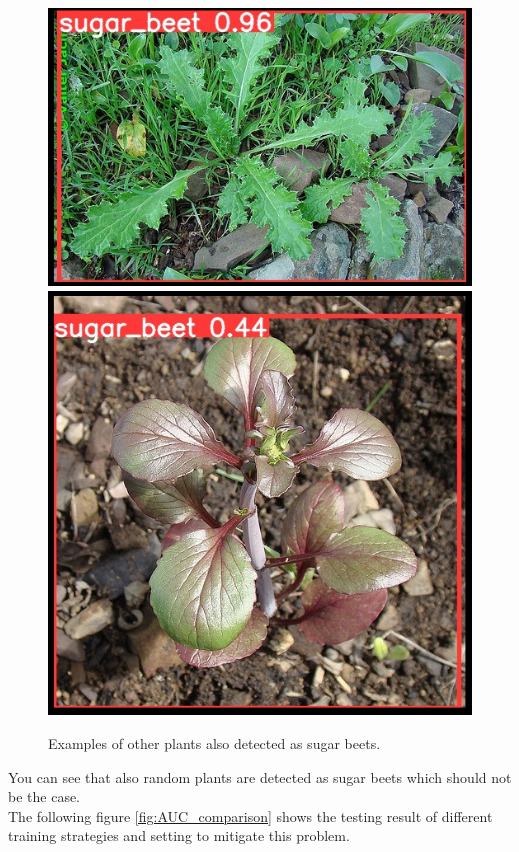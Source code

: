\begin{figure}[htb!]
	\centering
	\includegraphics[scale=0.458]{figures/false_positive_1.png}
	\includegraphics[scale=0.3]{figures/false_positive_2.png}
	\caption{Examples of other plants also detected as sugar beets.}
	\label{fig:false_positives}
\end{figure}

You can see that also random plants are detected as sugar beets which should not be the case.\\

The following figure \ref{fig:AUC_comparison} shows the testing result of different training strategies and setting to mitigate this problem.

